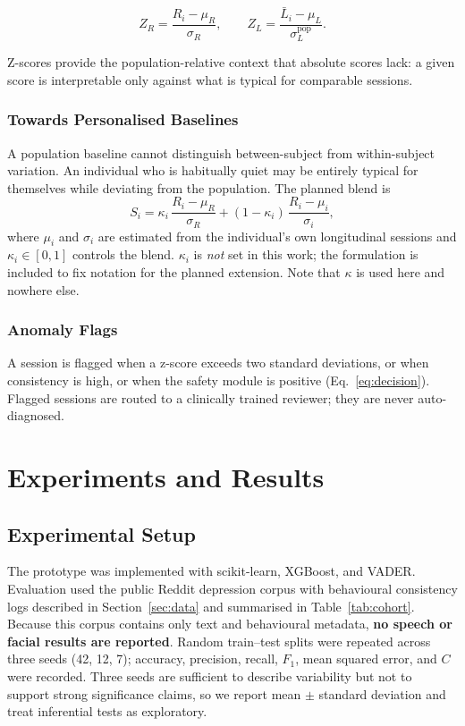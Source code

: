 \documentclass[12pt]{article}
\begin{document}
\begin{equation}
Z_R = \frac{R_i - \mu_R}{\sigma_R},
\qquad
Z_L = \frac{\bar{L}_i - \mu_L}{\sigma^{\text{pop}}_{L}} .
\end{equation}

\noindent Z-scores provide the population-relative context that absolute
scores lack: a given score is interpretable only against what is typical
for comparable sessions.

\subsubsection{Towards Personalised Baselines}

A population baseline cannot distinguish between-subject from
within-subject variation. An individual who is habitually quiet may be
entirely typical for themselves while deviating from the population. The
planned blend is
\begin{equation}
S_i = \kappa_i\,\frac{R_i - \mu_R}{\sigma_R}
    + (1-\kappa_i)\,\frac{R_i - \mu_i}{\sigma_i},
\end{equation}
where $\mu_i$ and $\sigma_i$ are estimated from the individual's own
longitudinal sessions and $\kappa_i \in [0,1]$ controls the blend.
$\kappa_i$ is \emph{not} set in this work; the formulation is included to
fix notation for the planned extension. Note that $\kappa$ is used here
and nowhere else.

\subsubsection{Anomaly Flags}

A session is flagged when a z-score exceeds two standard deviations, or
when consistency is high, or when the safety module is positive
(Eq.~\ref{eq:decision}). Flagged sessions are routed to a clinically
trained reviewer; they are never auto-diagnosed.

\section{Experiments and Results}
\label{sec:experiments}

\subsection{Experimental Setup}

The prototype was implemented with scikit-learn, XGBoost, and VADER.
Evaluation used the public Reddit depression corpus with behavioural
consistency logs described in Section~\ref{sec:data} and summarised in
Table~\ref{tab:cohort}. Because this corpus contains only text and
behavioural metadata, \textbf{no speech or facial results are
reported}. Random train--test splits were repeated
across three seeds (42, 12, 7); accuracy, precision, recall, $F_1$, mean
squared error, and $C$ were recorded. Three seeds are sufficient to
describe variability but not to support strong significance claims, so
we report mean $\pm$ standard deviation and treat inferential tests as
exploratory.
\end{document}
